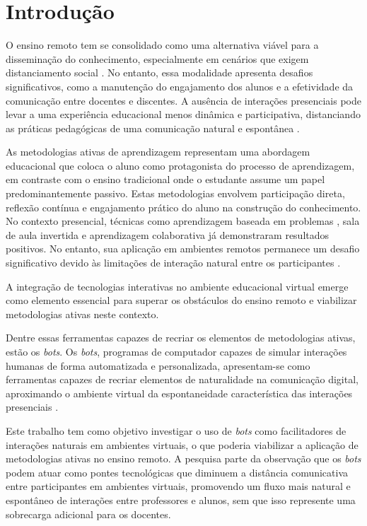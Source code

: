 \chapter{Introdução}
\label{cap:intro}

O ensino remoto tem se consolidado como uma alternativa viável para a
disseminação do conhecimento, especialmente em cenários que exigem
distanciamento social \cite{fabiane2024}. No entanto, essa modalidade apresenta
desafios significativos, como a manutenção do engajamento dos alunos e a
efetividade da comunicação entre docentes e discentes. A ausência de interações
presenciais pode levar a uma experiência educacional menos dinâmica e
participativa, distanciando as práticas pedagógicas de uma comunicação natural e
espontânea \cite{fabiane2024}.

As metodologias ativas \cite{prince2004} de aprendizagem representam uma
abordagem educacional que coloca o aluno como protagonista do processo de
aprendizagem, em contraste com o ensino tradicional onde o estudante assume um
papel predominantemente passivo. Estas metodologias envolvem participação
direta, reflexão contínua e engajamento prático do aluno na construção do
conhecimento. No contexto presencial, técnicas como aprendizagem baseada em
problemas \cite{yew2016}, sala de aula invertida \cite{vanalten2019} e
aprendizagem colaborativa \cite{laal2012} já demonstraram resultados positivos.
No entanto, sua aplicação em ambientes remotos permanece um desafio
significativo devido às limitações de interação natural entre os participantes
\cite{fabiane2024}.

A integração de tecnologias interativas no ambiente educacional virtual emerge
como elemento essencial para superar os obstáculos do ensino remoto e viabilizar
metodologias ativas neste contexto.

Dentre essas ferramentas capazes de recriar os elementos de metodologias ativas,
estão os \textit{bots}. Os \textit{bots}, programas de computador capazes de
simular interações humanas de forma automatizada e personalizada, apresentam-se
como ferramentas capazes de recriar elementos de naturalidade na comunicação
digital, aproximando o ambiente virtual da espontaneidade característica das
interações presenciais \cite{okonkwo2021}.

Este trabalho tem como objetivo investigar o uso de \textit{bots} como
facilitadores de interações naturais em ambientes virtuais, o que poderia
viabilizar a aplicação de metodologias ativas no ensino remoto. A pesquisa parte
da observação que os \textit{bots} podem atuar como pontes tecnológicas que
diminuem a distância comunicativa entre participantes em ambientes virtuais,
promovendo um fluxo mais natural e espontâneo de interações entre professores e
alunos, sem que isso represente uma sobrecarga adicional para os docentes.

